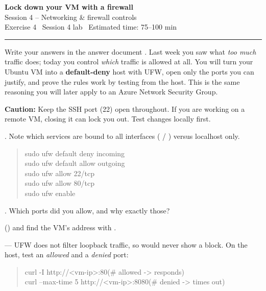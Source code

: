 \documentclass[11pt]{article}
\begin{document}
\begin{center}
  {\LARGE\bfseries Lock down your VM with a firewall}\\[3pt]
  {\large Session 4 -- Networking \& firewall controls}\\[5pt]
  {\small Exercise 4 \textperiodcentered\ Session 4 lab \textperiodcentered\ Estimated time: 75--100 min}
\end{center}
\vspace{2pt}\hrule\vspace{1.1em}

Write your answers in the answer document . Last week you saw what \emph{too much} traffic does;
today you control \emph{which} traffic is allowed at all. You will turn your Ubuntu VM into a
\textbf{default-deny} host with UFW, open only the ports you can justify, and prove the rules work by
testing from the host. This is the same reasoning you will later apply to an Azure Network Security
Group.

\noindent\textbf{Caution:} Keep the SSH port (22) open throughout. If you are working on a remote VM,
closing it can lock you out. Test changes locally first.

 . Note which services are
bound to all interfaces ( / \cmd{[::]}) versus localhost only.


\begin{quote}\ttfamily
sudo ufw default deny incoming\\
sudo ufw default allow outgoing\\
sudo ufw allow 22/tcp\\
sudo ufw allow 80/tcp\\
sudo ufw enable
\end{quote}

 . Which ports did you allow, and why exactly
those?

 () and find the VM's
address with .

 --- UFW does not filter loopback
traffic, so  would never show a block. On the host, test an \emph{allowed} and a
\emph{denied} port:
\begin{quote}\ttfamily
curl -I http://<vm-ip>:80\quad(\# allowed -> responds)\\
curl --max-time 5 http://<vm-ip>:8080\quad(\# denied -> times out)
\end{quote}
\end{document}
